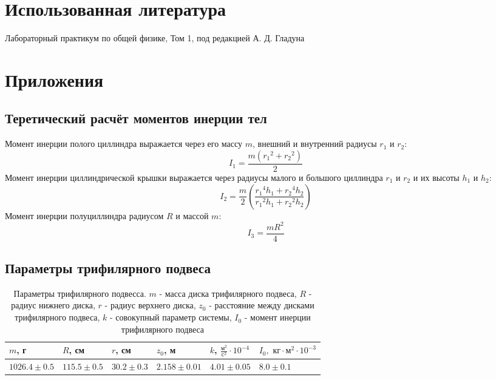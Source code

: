 \documentclass[12pt]{article}
\begin{document}
\section{Использованная литература}
\begin{thebibliography}{9}
    Лабораторный практикум по общей физике, Том 1, под редакцией А. Д. Гладуна
\end{thebibliography}

\section{Приложения}
\subsection{Теретический расчёт моментов инерции тел} \label{app_1}
Момент инерции полого циллиндра выражается через его массу $m$, внешний и внутренний радиусы $r_1$ и $r_2$:
$$I_1 = \frac{m({r_1}^2 + {r_2}^2)}{2}$$
Момент инерции циллиндрической крышки выражается через радиусы малого и большого циллиндра $r_1$ и $r_2$ и их высоты $h_1$ и $h_2$:
$$I_2 = \frac{m}{2}\left(\frac{{r_1}^4h_1 + {r_2}^4h_2}{{r_1}^2h_1 + {r_2}^2h_2}\right)$$
Момент инерции полуциллиндра радиусом $R$ и массой $m$:
$$I_3 = \frac{mR^2}{4}$$
\subsection{Параметры трифилярного подвеса} \label{app_2}
\begin{table}[H]
    \centering
    \begin{tabular}{|l|l|l|l|l|l|}
        \hline
        $m$, г           & $R$, см         & $r$, см        & $z_0$, м         & $k$, $\frac{\textrm{м}^2}{\textrm{с}^2} \cdot 10^{-4}$ & $I_0, \textrm{ кг}\cdot\textrm{м}^2\cdot 10^{-3}$ \\ 
        \hline
        $1026.4 \pm 0.5$ & $115.5 \pm 0.5$ & $30.2 \pm 0.3$ & $2.158 \pm 0.01$ & $4.01 \pm 0.05$                                        & $8.0 \pm 0.1$                                     \\
        \hline
    \end{tabular}
    
    \caption{Параметры трифилярного подвесса. $m$ - масса диска трифилярного подвеса,
        $R$ - радиус нижнего диска, $r$ - радиус верхнего диска, $z_0$ - расстояние между дисками трифилярного подвеса, $k$ - совокупный 
        параметр системы, $I_0$ - момент инерции трифилярного подвеса}
    \label{tab:1}
\end{table}
\end{document}
